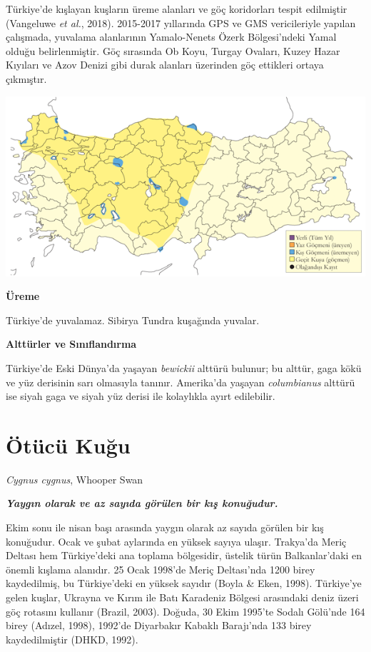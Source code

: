 \documentclass[
  a4paper,
  DIV=11,
  numbers=noendperiod]{scrreprt}
\begin{document}
Türkiye'de kışlayan kuşların üreme alanları ve göç koridorları tespit
edilmiştir (Vangeluwe \emph{et al.}, 2018). 2015-2017 yıllarında GPS ve
GMS vericileriyle yapılan çalışmada, yuvalama alanlarının Yamalo-Nenets
Özerk Bölgesi'ndeki Yamal olduğu belirlenmiştir. Göç sırasında Ob Koyu,
Turgay Ovaları, Kuzey Hazar Kıyıları ve Azov Denizi gibi durak alanları
üzerinden göç ettikleri ortaya çıkmıştır.

\includegraphics{images/harita_Page_009.png}

\textbf{Üreme}

Türkiye'de yuvalamaz. Sibirya Tundra kuşağında yuvalar.

\textbf{Alttürler ve Sınıflandırma}

Türkiye'de Eski Dünya'da yaşayan \emph{bewickii} alttürü bulunur; bu
alttür, gaga kökü ve yüz derisinin sarı olmasıyla tanınır. Amerika'da
yaşayan \emph{columbianus} alttürü ise siyah gaga ve siyah yüz derisi
ile kolaylıkla ayırt edilebilir.

\section{Ötücü Kuğu}\label{uxf6tuxfccuxfc-kuux11fu}

\emph{Cygnus cygnus}, Whooper Swan

\textbf{\emph{Yaygın olarak ve az sayıda görülen bir kış konuğudur.}}

Ekim sonu ile nisan başı arasında yaygın olarak az sayıda görülen bir
kış konuğudur. Ocak ve şubat aylarında en yüksek sayıya ulaşır.
Trakya'da Meriç Deltası hem Türkiye'deki ana toplama bölgesidir, üstelik
türün Balkanlar'daki en önemli kışlama alanıdır. 25 Ocak 1998'de Meriç
Deltası'nda 1200 birey kaydedilmiş, bu Türkiye'deki en yüksek sayıdır
(Boyla \& Eken, 1998). Türkiye'ye gelen kuşlar, Ukrayna ve Kırım ile
Batı Karadeniz Bölgesi arasındaki deniz üzeri göç rotasını kullanır
(Brazil, 2003). Doğuda, 30 Ekim 1995'te Sodalı Gölü'nde 164 birey
(Adızel, 1998), 1992'de Diyarbakır Kabaklı Barajı'nda 133 birey
kaydedilmiştir (DHKD, 1992).
\end{document}
